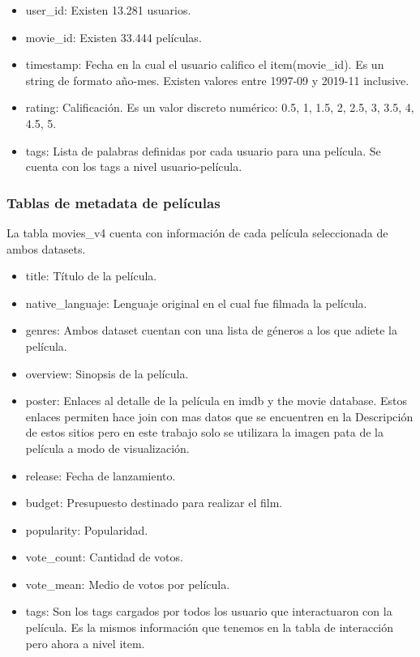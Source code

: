 \documentclass[11pt,a4paper,twoside]{thesis}
\begin{document}
\begin{itemize}
	\item user\_id:  Existen 13.281 usuarios.
	\item movie\_id: Existen 33.444 películas.
	\item timestamp: Fecha en la cual el usuario califico el item(movie\_id). Es un string de formato año-mes. Existen valores entre 1997-09 y 2019-11 inclusive.
	\item rating:    Calificación. Es un valor discreto numérico: 0.5, 1, 1.5, 2, 2.5, 3, 3.5, 4, 4.5, 5.
	\item tags:      Lista de palabras definidas por cada usuario para una película. Se cuenta con los tags a nivel usuario-película.
\end{itemize}


\subsubsection*{Tablas de metadata de películas}

La tabla movies\_v4 cuenta con información de cada película seleccionada de ambos datasets. 

\begin{itemize}
	\item title: 	Título de la película.
	\item native\_languaje: Lenguaje original en el cual fue filmada la película.
	\item genres:  	Ambos dataset cuentan con una lista de géneros a los que adiete la película.
	\item overview:	Sinopsis de la película.
	\item poster:	Enlaces al detalle de la película en imdb y the movie database. Estos enlaces
					permiten hace join con mas datos que se encuentren en la Descripción de estos
			 		sitios pero en este trabajo solo se utilizara la imagen pata de la película
					a modo de visualización.
	\item release: 		Fecha de lanzamiento.
	\item budget: 		Presupuesto destinado para realizar el film.
	\item popularity: 	Popularidad.
	\item vote\_count: 	Cantidad de votos.
	\item vote\_mean: 	Medio de votos por película.
	\item tags:         Son los tags cargados por todos los usuario que interactuaron con la película. 
						Es la mismos información que tenemos en la tabla de interacción pero ahora a nivel item.
\end{itemize}
\end{document}
